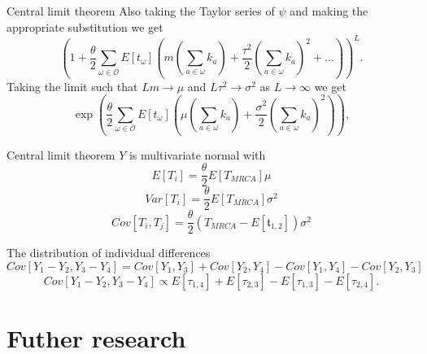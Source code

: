 \documentclass{beamer}
\begin{document}
\begin{frame}{Central limit theorem}
  Also taking the Taylor series of $\psi$ and making the appropriate substitution we get
  \begin{equation*}
    \left( 1 + \frac{\theta}{2} \sum_{\omega \in \mathcal{O}} E[t_{\omega}]\left( m \left(
          \sum_{a \in \omega} k_a\right) + \frac{\tau^2}{2}\left( \sum_{a \in \omega}
          k_a\right)^2 + \ldots\right)\right)^L.
  \end{equation*}
  Taking the limit such that $Lm \to \mu$ and $L\tau^2\to \sigma^2$ as $L
  \to \infty$ we get
  \begin{equation*}
    \exp \left( \frac{\theta}{2} \sum_{\omega \in \mathcal{O}}E[t_{\omega}] \left( \mu \left(
          \sum_{a \in \omega} k_a\right) + \frac{\sigma^2}{2}\left( \sum_{a \in \omega}
          k_a\right)^2\right)\right),
  \end{equation*}
\end{frame}

\begin{frame}{Central limit theorem}
  $Y$ is multivariate normal with 
  \begin{equation*}
    E[T_i] = \frac{\theta}{2} E[T_{MRCA}] \mu
  \end{equation*}
  \begin{equation*}
    Var[T_i] = \frac{\theta}{2} E[T_{MRCA}] \sigma^2
  \end{equation*}
  \begin{equation*}
    Cov[T_i, T_j] = \frac{\theta}{2} (T_{MRCA}-E[\mathfrak{t}_{1,2}] )\sigma^2
  \end{equation*}
\end{frame}

\begin{frame}{The distribution of individual differences}
  \small
  \begin{equation*}
    \label{eq:cov}
    Cov[Y_1-Y_2,Y_3-Y_4]=Cov[Y_1,Y_3]+Cov[Y_2,Y_4]-Cov[Y_1,Y_4]-Cov[Y_2,Y_3]
  \end{equation*}
  \begin{equation*}
    \label{eq:covcoal}
    Cov[Y_1-Y_2,Y_3-Y_4] \propto E[\tau_{1,4}] + E[\tau_{2,3}] - E[\tau_{1,3}] - E[\tau_{2,4}].
  \end{equation*}
\end{frame}

\section{Futher research}
\end{document}
